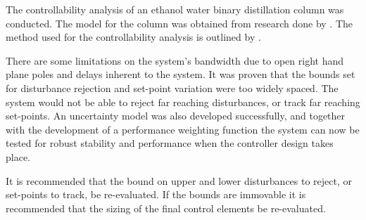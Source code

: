 The controllability analysis of an ethanol water binary distillation column was conducted. The model for the column was obtained from research done by \textcite{ogun}. The method used for the controllability analysis is outlined by \textcite{skogestad}.

There are some limitations on the system's bandwidth due to open right hand plane poles and delays inherent to the system. It was proven that the bounds set for disturbance rejection and set-point variation were too widely spaced. The system would not be able to reject far reaching disturbances, or track far reaching set-points. An uncertainty model was also developed successfully, and together with the development of a performance weighting function the system can now be tested for robust stability and performance when the controller design takes place.

It is recommended that the bound on upper and lower disturbances to reject, or set-points to track, be re-evaluated. If the bounds are immovable it is recommended that the sizing of the final control elements be re-evaluated.